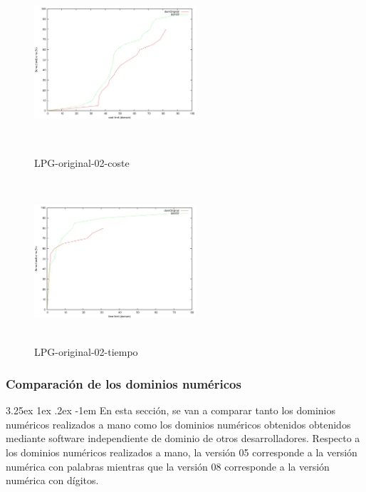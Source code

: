 \documentclass{article}
\makeatletter
\renewcommand\paragraph{\@startsection{paragraph}{5}{\z@}%
  {3.25ex \@plus1ex \@minus.2ex}%
  {-1em}%
  {\normalfont\normalsize\bfseries}}
\makeatother
\begin{document}
\begin{figure}[!htb]
   \begin{minipage}{0.48\textwidth}
     \centering
     \includegraphics[width=6cm, height=6cm]{lpg-or-02-cost}
    \caption{LPG-original-02-coste}
   \end{minipage}\hfill
   \begin {minipage}{0.48\textwidth}
     \centering
     \includegraphics[width=6cm, height=6cm]{lpg-or-02-time}
    \caption{LPG-original-02-tiempo}
   \end{minipage}
\end{figure}

\subsubsection{Comparación de los dominios numéricos}
\paragraph{}
En esta sección, se van a comparar tanto los dominios numéricos realizados a mano como los dominios numéricos obtenidos obtenidos mediante software independiente de dominio de otros desarrolladores. Respecto a los dominios numéricos realizados a mano, la versión 05 corresponde a la versión numérica con palabras mientras que la versión 08 corresponde a la versión numérica con dígitos.
\end{document}
